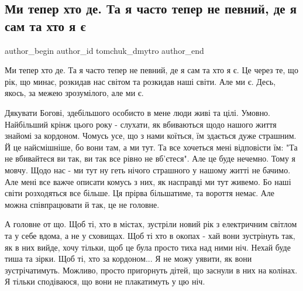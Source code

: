  
 
 
 
 

\subsection{Ми тепер хто де. Та я часто тепер не певний, де я  сам та хто я є}
\label{sec:31_12_2022.fb.tomchuk_dmytro.1.mi_teper_khto_de__ta}

\ifcmt
 author_begin
   author_id tomchuk_dmytro
 author_end
\fi

Ми тепер хто де. Та я часто тепер не певний, де я  сам та хто я є. Це через те,
що рік, що минає, розкидав нас світом та розкидав наші світи. Але ми є. Десь,
якось, за межею зрозумілого, але ми є. 

Дякувати Богові, здебільшого особисто в  мене люди живі та цілі. Умовно.
Найбільший крінж цього року - слухати, як вбиваються щодо нашого життя знайомі
за кордоном. Чомусь усе, що з нами коїться, їм здається дуже страшним. Й це
найсмішніше, бо вони там, а  ми тут. Та все хочеться мені відповісти їм: "Та не
вбивайтеся ви так, ви так все рівно не вб'єтеся". Але це буде нечемно. Тому я
мовчу. Щодо нас - ми тут ну геть нічого страшного у нашому житті не бачимо. Але
мені все важче описати комусь з них, як насправді ми тут живемо. Бо наші світи
розходяться все більше. Ця прірва більшатиме, та вороття немає. Але можна
співпрацювати й так, це не головне.

А головне от що. Щоб ті, хто в містах, зустріли новий рік з електричним світлом
та у себе вдома, а не у сховищах. Щоб ті хто в окопах - хай вони зустрінуть
так, як в них вийде, хочу тільки, щоб це була просто тиха над ними ніч. Нехай
буде тиша та зірки. Щоб ті, хто за кордоном... Я не можу уявити, як вони
зустрічатимуть. Можливо, просто пригорнуть дітей, що заснули в них на колінах.
Я тільки сподіваюся, що вони не плакатимуть у цю ніч.

